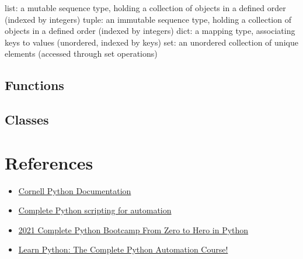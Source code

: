 \documentclass[12pt, a4paper]{article}
\begin{document}
    list: a mutable sequence type, holding a collection of objects in a defined order (indexed by integers)
    tuple: an immutable sequence type, holding a collection of objects in a defined order (indexed by integers)
    dict: a mapping type, associating keys to values (unordered, indexed by keys)
    set: an unordered collection of unique elements (accessed through set operations)

    \subsection{Functions}
    
    \subsection{Classes}
    
    \section{References}

	\begin{itemize}
        \item \href{https://cvw.cac.cornell.edu/python}{Cornell Python Documentation}  
        \item \href{https://www.udemy.com/course/complete-python-scripting-for-automation/}{Complete Python scripting for automation}
        \item \href{https://www.udemy.com/course/complete-python-bootcamp/}{2021 Complete Python Bootcamp From Zero to Hero in Python }
        \item \href{https://www.udemy.com/course/pythonautomation/}{Learn Python: The Complete Python Automation Course!}      
	\end{itemize}
	
	
\end{document}
